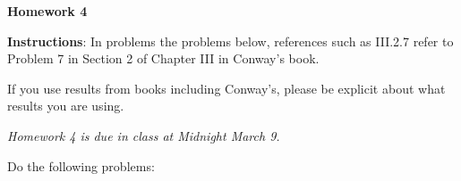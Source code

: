 \documentclass{article}%
\begin{document}
\begin{center}

\textbf{Homework 4}\bigskip

\end{center}



\noindent\textbf{Instructions}:
\noindent In problems the problems below, references such as III.2.7 refer to Problem 7 in Section 2 of Chapter III in Conway's book.\smallskip



\noindent If you use results from books including Conway's, please be explicit about what results you are using.






\begin{center}

\emph{Homework 4 is due in class at Midnight March 9.}

\end{center} 

\medskip

Do the following problems:
\end{document}
